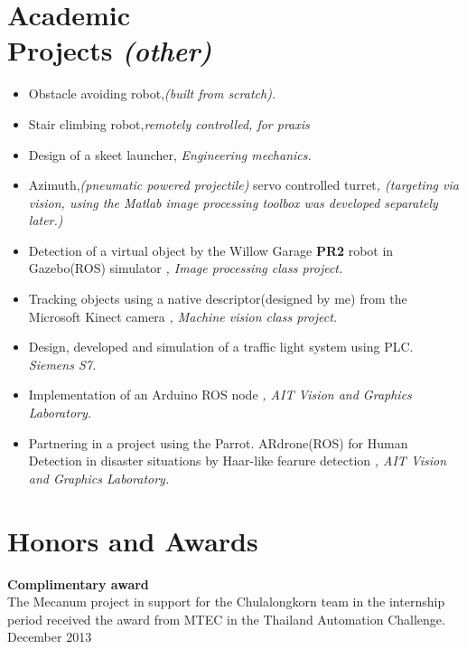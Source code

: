 \documentclass[margin]{res}
\begin{document}
\begin{resume}
\begin{itemize}
\end{itemize}


\section{Academic \\ Projects \textit{(other)}}
\begin{itemize} \itemsep -2pt
  \item Obstacle avoiding robot,\textit{(built from scratch).}
  \item Stair climbing robot,\textit{remotely controlled,  for praxis}
  \item Design of a skeet launcher, \textit{Engineering mechanics.}
  \item Azimuth,\textit{(pneumatic powered projectile)} servo controlled
  turret\textit{, (targeting via vision, using the
  Matlab\textsuperscript{\textregistered} image processing toolbox was developed
  separately later.)}
  \item Detection of a virtual object by the Willow
  Garage\textsuperscript{{\ssmall\texttrademark}}  {\bf PR2} robot in Gazebo(ROS)
  simulator \textit{, Image processing class project.}
  \item Tracking objects using a native descriptor(designed by me) from the
  Microsoft\textsuperscript{\ssmall{\textregistered}} Kinect camera \textit{,
  Machine vision class project.}
  \item Design, developed and simulation of a traffic light system using PLC.
  \textit{Siemens S7.}
  \item Implementation of an Arduino ROS node \textit{, AIT Vision and Graphics
  Laboratory.}
  \item Partnering in a project using the Parrot.
  ARdrone\textsuperscript{\ssmall{\textregistered}}(ROS) for Human Detection
  in disaster situations by Haar-like fearure detection \textit{, AIT Vision and
  Graphics Laboratory.}
\end{itemize}

\section{Honors and Awards} {\bf Complimentary award} \\
The Mecanum project in support for the Chulalongkorn team in the
internship period received the award from MTEC in
the Thailand Automation Challenge. \\  \phantom \hfill \hfill December
2013


\end{resume}
\end{document}
